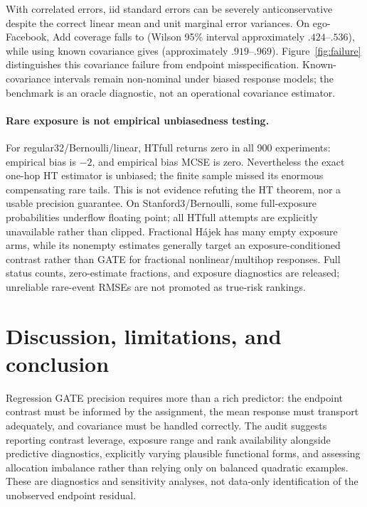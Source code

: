 \documentclass{article}
\begin{document}
With correlated errors, iid standard errors can be severely anticonservative despite the correct linear mean and unit marginal error variances. On ego-Facebook, Add coverage falls to \EgoCorrCoverage{} (Wilson 95\% interval approximately $.424$--$.536$), while using known covariance gives \EgoKnownCoverage{} (approximately $.919$--$.969$). Figure~\ref{fig:failure} distinguishes this covariance failure from endpoint misspecification. Known-covariance intervals remain non-nominal under biased response models; the benchmark is an oracle diagnostic, not an operational covariance estimator.

\paragraph{Rare exposure is not empirical unbiasedness testing.}
For regular32/Bernoulli/linear, HTfull returns zero in all 900 experiments: empirical bias is $-2$, and empirical bias MCSE is zero. Nevertheless the exact one-hop HT estimator is unbiased; the finite sample missed its enormous compensating rare tails. This is not evidence refuting the HT theorem, nor a usable precision guarantee. On Stanford3/Bernoulli, some full-exposure probabilities underflow floating point; all HTfull attempts are explicitly unavailable rather than clipped. Fractional H\'ajek has many empty exposure arms, while its nonempty estimates generally target an exposure-conditioned contrast rather than GATE for fractional nonlinear/multihop responses. Full status counts, zero-estimate fractions, and exposure diagnostics are released; unreliable rare-event RMSEs are not promoted as true-risk rankings.

\section{Discussion, limitations, and conclusion}\label{sec:limitations}
Regression GATE precision requires more than a rich predictor: the endpoint contrast must be informed by the assignment, the mean response must transport adequately, and covariance must be handled correctly. The audit suggests reporting contrast leverage, exposure range and rank availability alongside predictive diagnostics, explicitly varying plausible functional forms, and assessing allocation imbalance rather than relying only on balanced quadratic examples. These are diagnostics and sensitivity analyses, not data-only identification of the unobserved endpoint residual.
\end{document}
